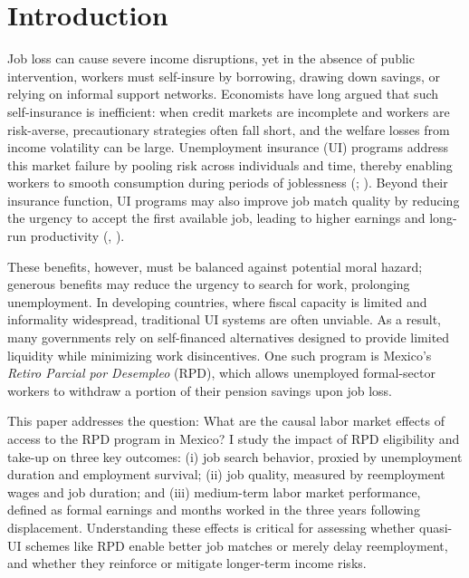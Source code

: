 \documentclass[
  4pt,
]{report}
\author{}
\date{August 11, 2025}
\renewcommand*\contentsname{Table of contents}
\newcommand\contentsname{Table of contents}
\begin{document}
\renewcommand*\contentsname{Table of contents}
{
\setcounter{tocdepth}{1}
\tableofcontents
}
\listoffigures
\listoftables

\chapter*{Introduction}\label{introduction}

Job loss can cause severe income disruptions, yet in the absence of
public intervention, workers must self-insure by borrowing, drawing down
savings, or relying on informal support networks. Economists have long
argued that such self-insurance is inefficient: when credit markets are
incomplete and workers are risk-averse, precautionary strategies often
fall short, and the welfare losses from income volatility can be large.
Unemployment insurance (UI) programs address this market failure by
pooling risk across individuals and time, thereby enabling workers to
smooth consumption during periods of joblessness
(; ). Beyond their insurance function, UI programs may also improve
job match quality by reducing the urgency to accept the first available
job, leading to higher earnings and long-run productivity
(,
).

These benefits, however, must be balanced against potential moral
hazard; generous benefits may reduce the urgency to search for work,
prolonging unemployment. In developing countries, where fiscal capacity
is limited and informality widespread, traditional UI systems are often
unviable. As a result, many governments rely on self-financed
alternatives designed to provide limited liquidity while minimizing work
disincentives. One such program is Mexico's \emph{Retiro Parcial por
Desempleo} (RPD), which allows unemployed formal-sector workers to
withdraw a portion of their pension savings upon job loss.

This paper addresses the question: What are the causal labor market
effects of access to the RPD program in Mexico? I study the impact of
RPD eligibility and take-up on three key outcomes: (i) job search
behavior, proxied by unemployment duration and employment survival; (ii)
job quality, measured by reemployment wages and job duration; and (iii)
medium-term labor market performance, defined as formal earnings and
months worked in the three years following displacement. Understanding
these effects is critical for assessing whether quasi-UI schemes like
RPD enable better job matches or merely delay reemployment, and whether
they reinforce or mitigate longer-term income risks.
\end{document}

